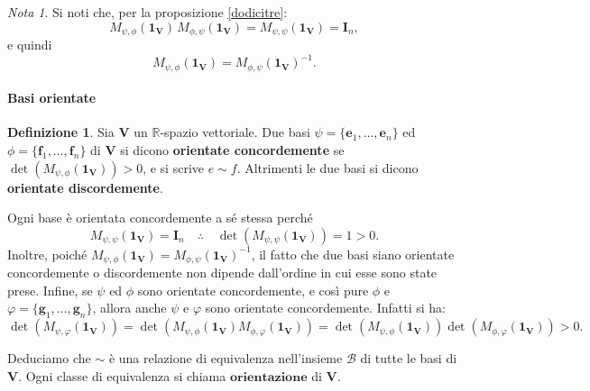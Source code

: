 \documentclass{article}
\theoremstyle{plain}
\theoremstyle{definition}
\newtheorem{defn}{Definizione}[section]
\theoremstyle{remark}
\newtheorem{note}{Nota}
\begin{document}
\vspace{10pt}

\begin{note}
Si noti che, per la proposizione \ref{dodicitre}:
\[
M_{\psi,\phi}(\mathbf{1_V}) \, M_{\phi,\psi}(\mathbf{1_V}) = M_{\psi,\psi}(\mathbf{1_V}) = \mathbf{I}_n,
\]
e quindi
\begin{equation}\label{dodiciunooo}
    M_{\psi,\phi}(\mathbf{1_V}) = M_{\phi,\psi}(\mathbf{1_V})^{-1}.
\end{equation}    
\end{note}

\vspace{10pt}

\paragraph{Basi orientate}
\begin{bxthm}
\begin{defn}
Sia $\mathbf{V}$ un $\mathbb{R}$-spazio vettoriale.
Due basi $\psi = \{\mathbf{e}_1, \ldots, \mathbf{e}_n\}$ ed $\phi = \{\mathbf{f}_1, \ldots, \mathbf{f}_n\}$ di $\mathbf{V}$ si 
dicono \textbf{orientate concordemente} se $\det(M_{\psi,\phi}(\mathbf{1_V})) > 0$, e si scrive $e \sim f$. 
Altrimenti le due basi si dicono \textbf{orientate discordemente}.    
\end{defn}
\end{bxthm}

\vspace{10pt}

Ogni base è orientata concordemente a sé stessa perché 
\[M_{\psi,\psi}(\mathbf{1_V}) = \mathbf{I}_n \quad\therefore\quad \det(M_{\psi,\psi}(\mathbf{1_V}))=1>0. \]
Inoltre, poiché $M_{\psi,\phi}(\mathbf{1_V}) = M_{\phi,\psi}(\mathbf{1_V})^{-1}$, il fatto che due basi siano orientate concordemente o discordemente non dipende dall'ordine in cui esse sono state prese. 
Infine, se $\psi$ ed $\phi$ sono orientate concordemente, e così pure $\phi$ e $\varphi = \{\mathbf{g}_1, \ldots, \mathbf{g}_n\}$, allora anche $\psi$ e $\varphi$ sono orientate concordemente. 
Infatti si ha:
\[
\det(M_{\psi,\varphi}(\mathbf{1_V})) = \det(M_{\psi,\phi}(\mathbf{1_V}) M_{\phi,\varphi}(\mathbf{1_V})) = \det(M_{\psi,\phi}(\mathbf{1_V})) \det(M_{\phi,\varphi}(\mathbf{1_V})) > 0.
\]

\vspace{10pt}

Deduciamo che $\sim$ è una relazione di equivalenza nell'insieme $\mathcal{B}$ di tutte le basi di $\mathbf{V}$. 
Ogni classe di equivalenza si chiama $\mathbf{orientazione}$ di $\mathbf{V}$.
\end{document}
